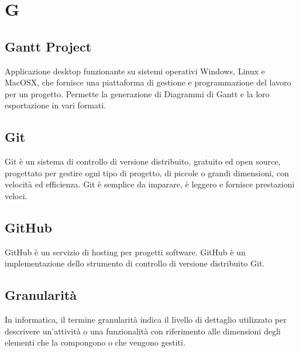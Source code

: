 \section{G}

	\subsection*{Gantt Project}
		
		Applicazione desktop funzionante su sistemi operativi Windows, Linux e MacOSX, che fornisce una piattaforma di gestione e programmazione del lavoro per un progetto. Permette la generazione di Diagrammi di Gantt e la loro esportazione in vari formati.

    \subsection*{Git}

        Git è un sistema di controllo di versione distribuito, gratuito ed open source, progettato per gestire
        ogni tipo di progetto, di piccole o grandi dimensioni, con velocità ed efficienza.
        Git è semplice da imparare, è leggero e fornisce prestazioni veloci.

    \subsection*{GitHub}

        GitHub è un servizio di hosting per progetti software. GitHub è un implementazione dello strumento di
        controllo di versione distribuito Git.

    \subsection*{Granularità}

            In informatica, il termine granularità indica il livello di dettaglio utilizzato per descrivere un'attività
            o una funzionalità con riferimento alle dimensioni degli elementi che la compongono o che vengono gestiti.